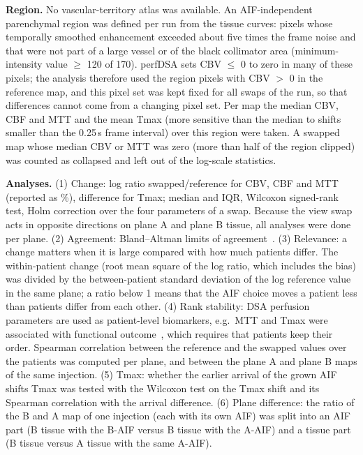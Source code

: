 \textbf{Region.} No vascular-territory atlas was available. An AIF-independent parenchymal region was defined per run
from the tissue curves: pixels whose temporally smoothed enhancement exceeded about five times the frame noise and
that were not part of a large vessel or of the black collimator area (minimum-intensity value $\geq$ 120 of 170).
perfDSA sets CBV $\leq$ 0 to zero in many of these pixels; the analysis therefore used the region pixels with CBV
$>$ 0 in the reference map, and this pixel set was kept fixed for all swaps of the run, so that differences cannot
come from a changing pixel set. Per map the median CBV, CBF and MTT and the mean Tmax (more sensitive than the median
to shifts smaller than the 0.25\,s frame interval) over this region were taken. A swapped map whose median CBV or
MTT was zero (more than half of the region clipped) was counted as collapsed and left out of the log-scale
statistics.

\textbf{Analyses.} (1) Change: log ratio swapped/reference for CBV, CBF and MTT (reported as \%), difference for
Tmax; median and IQR, Wilcoxon signed-rank test, Holm correction over the four parameters of a swap. Because the view
swap acts in opposite directions on plane A and plane B tissue, all analyses were done per plane. (2) Agreement:
Bland--Altman limits of agreement~\cite{bland1999}. (3) Relevance: a change matters when it is large compared with how
much patients differ. The within-patient change (root mean square of the log ratio, which includes the bias) was
divided by the between-patient standard deviation of the log reference value in the same plane; a ratio below 1 means
that the AIF choice moves a patient less than patients differ from each other. (4) Rank stability: DSA perfusion
parameters are used as patient-level biomarkers, e.g.\ MTT and Tmax were associated with functional
outcome~\cite{vandersluijs2026}, which requires that patients keep their order. Spearman correlation between the
reference and the swapped values over the patients was computed per plane, and between the plane A and plane B maps
of the same injection. (5) Tmax: whether the earlier arrival of the grown AIF shifts Tmax was tested with the
Wilcoxon test on the Tmax shift and its Spearman correlation with the arrival difference. (6) Plane difference: the
ratio of the B and A map of one injection (each with its own AIF) was split into an AIF part (B tissue with the B-AIF
versus B tissue with the A-AIF) and a tissue part (B tissue versus A tissue with the same A-AIF).

